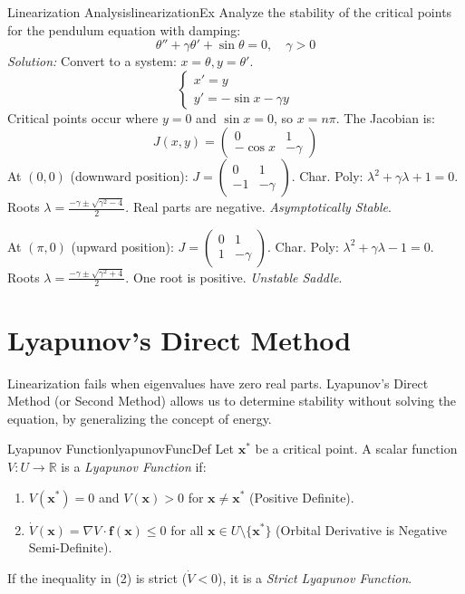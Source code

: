 \documentclass{book}
\newcommand{\R}{{\mathbb{R}}}
\begin{document}
\begin{example}{Linearization Analysis}{linearizationEx}
    Analyze the stability of the critical points for the pendulum equation with damping:
    \[
        \theta'' + \gamma \theta' + \sin \theta = 0, \quad \gamma > 0
    \]
    \emph{Solution:}
    Convert to a system: $x = \theta, y = \theta'$.
    \[
        \begin{cases} x' = y \\ y' = -\sin x - \gamma y \end{cases}
    \]
    Critical points occur where $y=0$ and $\sin x = 0$, so $x = n\pi$.
    The Jacobian is:
    \[
        J(x,y) = \begin{pmatrix} 0 & 1 \\ -\cos x & -\gamma \end{pmatrix}
    \]
    At $(0,0)$ (downward position): $J = \begin{pmatrix} 0 & 1 \\ -1 & -\gamma \end{pmatrix}$.
    Char. Poly: $\lambda^2 + \gamma \lambda + 1 = 0$. Roots $\lambda = \frac{-\gamma \pm \sqrt{\gamma^2 - 4}}{2}$. Real parts are negative. \emph{Asymptotically Stable}.

    At $(\pi, 0)$ (upward position): $J = \begin{pmatrix} 0 & 1 \\ 1 & -\gamma \end{pmatrix}$.
    Char. Poly: $\lambda^2 + \gamma \lambda - 1 = 0$. Roots $\lambda = \frac{-\gamma \pm \sqrt{\gamma^2 + 4}}{2}$. One root is positive. \emph{Unstable Saddle}.
\end{example}

\section{Lyapunov's Direct Method}

Linearization fails when eigenvalues have zero real parts. Lyapunov's Direct Method (or Second Method) allows us to determine stability without solving the equation, by generalizing the concept of energy.

\begin{defn}{Lyapunov Function}{lyapunovFuncDef}
    Let $\mathbf{x}^*$ be a critical point. A scalar function $V: U \to \R$ is a \emph{Lyapunov Function} if:
    \begin{enumerate}
        \item $V(\mathbf{x}^*) = 0$ and $V(\mathbf{x}) > 0$ for $\mathbf{x} \ne \mathbf{x}^*$ (Positive Definite).
        \item $\dot{V}(\mathbf{x}) = \nabla V \cdot \mathbf{f}(\mathbf{x}) \le 0$ for all $\mathbf{x} \in U \setminus \{\mathbf{x}^*\}$ (Orbital Derivative is Negative Semi-Definite).
    \end{enumerate}
    If the inequality in (2) is strict ($\dot{V} < 0$), it is a \emph{Strict Lyapunov Function}.
\end{defn}
\end{document}
